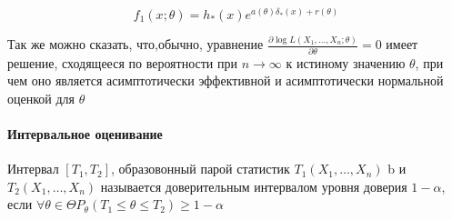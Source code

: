\documentclass[main.tex]{subfiles}
\begin{document}
\begin{definition}
	$$f_1(x;\theta)=h_*(x)e^{a(\theta)\delta_*(x)+r(\theta)}$$
\end{definition}

Так же можно сказать, что,обычно, уравнение $\frac{\partial\log L(X_1,\dots,X_n;\theta)}{\partial\theta}=0$ имеет решение, сходящееся по вероятности при $n \rightarrow \infty$ к истиному значению $\theta$, при чем оно является асимптотически эффективной и асимптотически нормальной оценкой для $\theta$

\paragraph{Интервальное оценивание}

\begin{definition}
	Интервал $[T_1,T_2]$, образовонный парой статистик $T_1(X_1,\dots,X_n)$ b и $T_2(X_1,\dots,X_n)$ называется доверительным интервалом уровня доверия $1-\alpha$, если $\forall \theta\in\Theta P_\theta(T_1\leq\theta\leq T_2)\geq 1-\alpha$
\end{definition}
\end{document}
